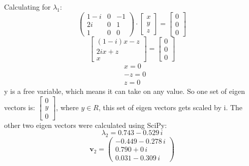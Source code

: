 \documentclass{article}
\begin{document}
            Calculating for $\lambda_1$:
            \[
                \begin{pmatrix}1 - i  & 0 & -1 \\2i  & 0 & 1 \\ 1 & 0 & 0 \end{pmatrix} \cdot 
                \begin{bmatrix}
                x \\
                y \\
                z
                \end{bmatrix}
                =
                \begin{bmatrix}
                    0 \\
                    0 \\
                    0
                \end{bmatrix}
            \]
            \[
                \begin{bmatrix}
                (1-i)x - z \\
                2ix + z \\
                x
                \end{bmatrix}
                =
                \begin{bmatrix}
                    0 \\
                    0 \\
                    0
                \end{bmatrix}
            \]
            \begin{align*}
                &x = 0 \\
                &-z = 0 \\
                &z = 0
            \end{align*}
            y is a free variable, which means it can take on any value. So one set of eigen vectors is: $\begin{bmatrix} 0 \\ y \\ 0 \end{bmatrix}$, where $y \in R$, this set of eigen vectors gets scaled by i.
            The other two eigen vectors were calculated using SciPy:
            \[
                \lambda_2 = 0.743 - 0.529\,i
            \]
            \[
                \mathbf{v}_2 = \begin{pmatrix}
                -0.449 - 0.278\,i \\
                0.790 + 0\,i \\
                0.031 - 0.309\,i
                \end{pmatrix}
            \]
            
\end{document}
